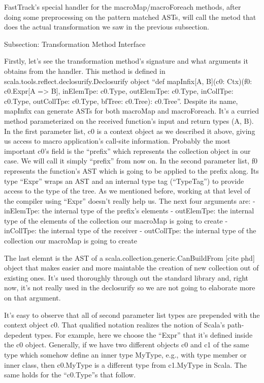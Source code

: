 FastTrack's special handler for the macroMap/macroForeach methods, after
doing some preprocessing on the pattern matched ASTs, will call the metod
that does the actual transformation we saw in the previous subsection. 


Subsection: Transformation Method Interface

Firstly, let's see the transformation method's signature and what arguments it
obtains from the handler. This method is defined in
scala.tools.reflect.declosurify.Declosurify object ``def mapInfix[A, B](c0:
Ctx)(f0: c0.Expr[A => B], inElemTpe: c0.Type, outElemTpe: c0.Type, inCollTpe:
c0.Type, outCollTpe: c0.Type, bfTree: c0.Tree): c0.Tree''. Despite its name,
mapInfix can generate ASTs for both macroMap and macroForeach. It's a curried
method parameterized on the received function's input and return types (A, B).
In the first parameter list, c0 is a context object as we described it above,
giving us access to macro application's call-site information. Probably the most
important c0's field is the ``prefix'' which represents the collection object in
our case. We will call it simply ``prefix'' from now on. In the second parameter
list, f0 represents the function's AST which is going to be applied to the
prefix along. Its type ``Expr'' wraps an AST and an internal type tag
(``TypeTag'') to provide access to the type of the tree. As we mentioned before,
working at that level of the compiler using ``Expr'' doesn't really help us. The
next four arguments are:
 - inElemTpe: the internal type of the prefix's elements
 - outElemTpe: the internal type of the elements of the collection our macroMap
is going to create
- inCollTpe: the internal type of the receiver
- outCollTpe: the internal type of the collection our macroMap is going to
create

The last elemnt is the AST of a scala.collection.generic.CanBuildFrom [cite phd]
object that makes easier and more maintable the creation of new collection out
of existing ones. It's used thoroughly through out the standard library and,
right now, it's not really used in the declosurify so we are not going to
elaborate more on that argument.

It's easy to observe that all of second parameter list types are prepended
with the context object c0. That qualified notation realizes the notion of
Scala's path-depedent types. For example, here we choose the ``Expr'' that it's
defined inside the c0 object. Generally, if we have two different objects c0 and
c1 of the same type which somehow define an inner type MyType, e.g., with type
member or inner class,  then c0.MyType is a different type from c1.MyType in
Scala. The same holds for the ``c0.Type''s that follow.


